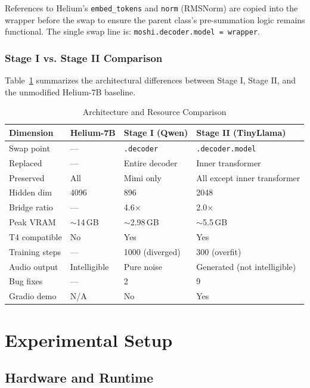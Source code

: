 \documentclass[conference]{IEEEtran}
\begin{document}
References to Helium's \texttt{embed\_tokens} and \texttt{norm} (RMSNorm)
are copied into the wrapper before the swap to ensure the parent class's
pre-summation logic remains functional.
The single swap line is: \texttt{moshi.decoder.model = wrapper}.

\subsubsection{Stage I vs. Stage II Comparison}

Table~\ref{tab:comparison} summarizes the architectural differences between
Stage I, Stage II, and the unmodified Helium-7B baseline.

\begin{table}[t]
\caption{Architecture and Resource Comparison}
\label{tab:comparison}
\centering
\small
\begin{tabular}{@{}p{2.1cm}p{1.5cm}p{1.6cm}p{1.5cm}@{}}
\toprule
\textbf{Dimension} & \textbf{Helium-7B} & \textbf{Stage I (Qwen)} & \textbf{Stage II (TinyLlama)} \\
\midrule
Swap point & --- & \texttt{.decoder} & \texttt{.decoder.model} \\
Replaced & --- & Entire decoder & Inner transformer \\
Preserved & All & Mimi only & All except inner transformer \\
Hidden dim & 4096 & 896 & 2048 \\
Bridge ratio & --- & 4.6$\times$ & 2.0$\times$ \\
Peak VRAM & $\sim$14\,GB & $\sim$2.98\,GB & $\sim$5.5\,GB \\
T4 compatible & No & Yes & Yes \\
Training steps & --- & 1000 (diverged) & 300 (overfit) \\
Audio output & Intelligible & Pure noise & Generated (not intelligible) \\
Bug fixes & --- & 2 & 9 \\
Gradio demo & N/A & No & Yes \\
\bottomrule
\end{tabular}
\end{table}

\section{Experimental Setup}
\label{sec:setup}

\subsection{Hardware and Runtime}
\end{document}

